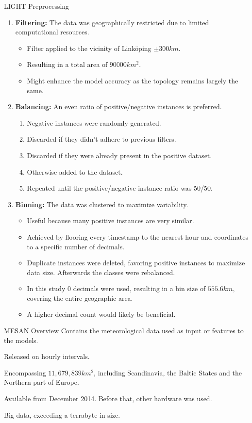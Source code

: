 \documentclass[10pt]{beamer}
\begin{document}
\begin{frame}[shrink=13]{LIGHT Preprocessing}
\begin{enumerate}
	\item \textbf{Filtering:} The data was geographically restricted due to limited computational resources.
		\begin{itemize}
			\item Filter applied to the vicinity of Linköping $\pm 300 km$.
			\item Resulting in a total area of $90000 km^2$.
			\item Might enhance the model accuracy as the topology remains largely the same.
		\end{itemize}
	\item \textbf{Balancing:} An even ratio of positive/negative instances is preferred.
		\begin{enumerate}
			\item Negative instances were randomly generated.
			\item Discarded if they didn't adhere to previous filters.
			\item Discarded if they were already present in the positive dataset.
			\item Otherwise added to the dataset.
			\item Repeated until the positive/negative instance ratio was 50/50.
		\end{enumerate}
	\item \textbf{Binning:} The data was clustered to maximize variability.
		\begin{itemize}
			\item Useful because many positive instances are very similar.
			\item Achieved by flooring every timestamp to the nearest hour and coordinates to a specific number of decimals.
			\item Duplicate instances were deleted, favoring positive instances to maximize data size. Afterwards the classes were rebalanced.
			\item In this study 0 decimals were used, resulting in a bin size of $555.6 km$, covering the entire geographic area.
			\item A higher decimal count would likely be beneficial.
		\end{itemize}
\end{enumerate}
\end{frame}


\begin{frame}{MESAN Overview}
Contains the meteorological data used as input or features to the models.
\par
Released on hourly intervals.
\par
Encompassing $11,679,839 km^2$, including Scandinavia, the Baltic States and the Northern part of Europe.
\par
Available from December 2014. Before that, other hardware was used.
\par
Big data, exceeding a terrabyte in size.
\end{frame}
\end{document}
